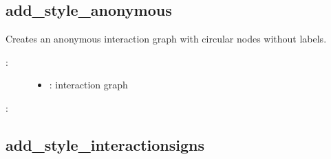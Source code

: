 \documentclass[letterpaper,10pt,english]{sphinxmanual}
\begin{document}
\subsection{add\_style\_anonymous}
\label{\detokenize{InteractionGraphs:add-style-anonymous}}\label{\detokenize{InteractionGraphs:id8}}

\begin{fulllineitems}
\label{\detokenize{InteractionGraphs:PyBoolNet.InteractionGraphs.add_style_anonymous}}
Creates an anonymous interaction graph with circular nodes without labels.
\begin{description}
\item[{:}] \leavevmode\begin{itemize}
\item {} 
: interaction graph

\end{itemize}

\end{description}

:

\begin{sphinxVerbatim}[commandchars=\\\{\}]
\end{sphinxVerbatim}

\end{fulllineitems}



\subsection{add\_style\_interactionsigns}
\label{\detokenize{InteractionGraphs:add-style-interactionsigns}}\label{\detokenize{InteractionGraphs:id9}}
\end{document}
